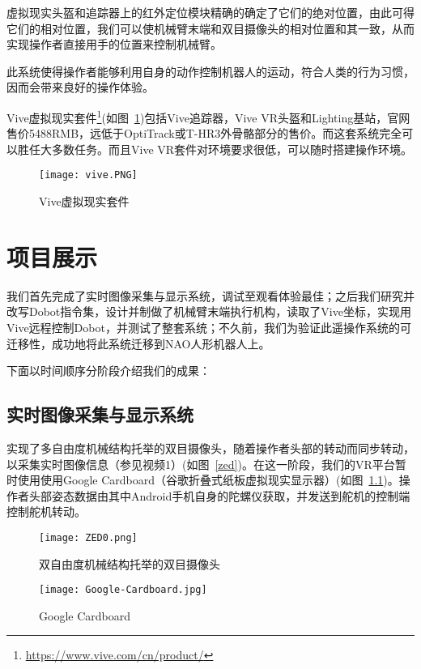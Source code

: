 虚拟现实头盔和追踪器上的红外定位模块精确的确定了它们的绝对位置，由此可得它们的相对位置，我们可以使机械臂末端和双目摄像头的相对位置和其一致，从而实现操作者直接用手的位置来控制机械臂。

此系统使得操作者能够利用自身的动作控制机器人的运动，符合人类的行为习惯，因而会带来良好的操作体验。

Vive虚拟现实套件\footnote{\url{https://www.vive.com/cn/product/}}(如图~\ref{vivekit})包括Vive追踪器，Vive VR头盔和Lighting基站，官网售价5488RMB，远低于OptiTrack或T-HR3外骨骼部分的售价。而这套系统完全可以胜任大多数任务。而且Vive VR套件对环境要求很低，可以随时搭建操作环境。
\begin{figure}[H]
\small
\centering
\texttt{[image: vive.PNG]}
\caption{Vive虚拟现实套件} 
\label{vivekit}
\end{figure}

\chapter{项目展示}

我们首先完成了实时图像采集与显示系统，调试至观看体验最佳；之后我们研究并改写Dobot指令集，设计并制做了机械臂末端执行机构，读取了Vive坐标，实现用Vive远程控制Dobot，并测试了整套系统；不久前，我们为验证此遥操作系统的可迁移性，成功地将此系统迁移到NAO人形机器人上。

下面以时间顺序分阶段介绍我们的成果：

\section{实时图像采集与显示系统}
实现了多自由度机械结构托举的双目摄像头，随着操作者头部的转动而同步转动，以采集实时图像信息{\kaishu （参见视频1）}(如图~\ref{zed})。在这一阶段，我们的VR平台暂时使用使用Google Cardboard（谷歌折叠式纸板虚拟现实显示器）(如图~\ref{card})。操作者头部姿态数据由其中Android手机自身的陀螺仪获取，并发送到舵机的控制端控制舵机转动。

\begin{figure}
\begin{minipage}{0.48\textwidth}
  \centering
  \texttt{[image: ZED0.png]}
  \caption{双自由度机械结构托举的双目摄像头}
  \label{zed}
\end{minipage}\hfill
\begin{minipage}{0.48\textwidth}
  \centering
  \texttt{[image: Google-Cardboard.jpg]}
  \caption{Google Cardboard}
  \label{card}
\end{minipage}
\end{figure}

